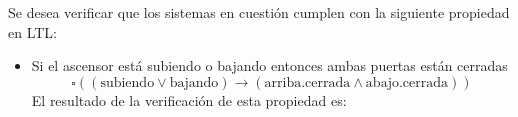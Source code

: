 Se desea verificar que los sistemas en cuestión cumplen con la siguiente propiedad en LTL:
\begin{itemize}
\item Si el ascensor está subiendo o bajando entonces ambas puertas están cerradas
\[ \square ((\text{subiendo} \lor \text{bajando}) \to (\text{arriba.cerrada} \land \text{abajo.cerrada})) \]
El resultado de la verificación de esta propiedad es:

\fbox{\parbox{\textwidth}{\scriptsize}}

\end{itemize}
